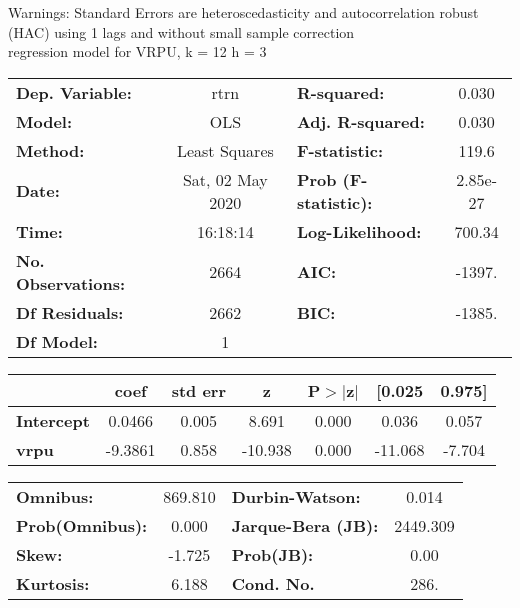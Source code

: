 Warnings: \newline
 [1] Standard Errors are heteroscedasticity and autocorrelation robust (HAC) using 1 lags and without small sample correction\\ 

regression model for VRPU, k = 12 h = 3\begin{center}
\begin{tabular}{lclc}
\toprule
\textbf{Dep. Variable:}    &       rtrn       & \textbf{  R-squared:         } &     0.030   \\
\textbf{Model:}            &       OLS        & \textbf{  Adj. R-squared:    } &     0.030   \\
\textbf{Method:}           &  Least Squares   & \textbf{  F-statistic:       } &     119.6   \\
\textbf{Date:}             & Sat, 02 May 2020 & \textbf{  Prob (F-statistic):} &  2.85e-27   \\
\textbf{Time:}             &     16:18:14     & \textbf{  Log-Likelihood:    } &    700.34   \\
\textbf{No. Observations:} &        2664      & \textbf{  AIC:               } &    -1397.   \\
\textbf{Df Residuals:}     &        2662      & \textbf{  BIC:               } &    -1385.   \\
\textbf{Df Model:}         &           1      & \textbf{                     } &             \\
\bottomrule
\end{tabular}
\begin{tabular}{lcccccc}
                   & \textbf{coef} & \textbf{std err} & \textbf{z} & \textbf{P$> |$z$|$} & \textbf{[0.025} & \textbf{0.975]}  \\
\midrule
\textbf{Intercept} &       0.0466  &        0.005     &     8.691  &         0.000        &        0.036    &        0.057     \\
\textbf{vrpu}      &      -9.3861  &        0.858     &   -10.938  &         0.000        &      -11.068    &       -7.704     \\
\bottomrule
\end{tabular}
\begin{tabular}{lclc}
\textbf{Omnibus:}       & 869.810 & \textbf{  Durbin-Watson:     } &    0.014  \\
\textbf{Prob(Omnibus):} &   0.000 & \textbf{  Jarque-Bera (JB):  } & 2449.309  \\
\textbf{Skew:}          &  -1.725 & \textbf{  Prob(JB):          } &     0.00  \\
\textbf{Kurtosis:}      &   6.188 & \textbf{  Cond. No.          } &     286.  \\
\bottomrule
\end{tabular}
\end{center}


